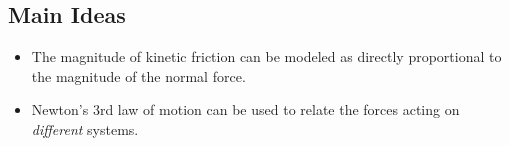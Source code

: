 \documentclass[]{article}
\begin{document}
\newpage
\begin{TeacherMargin}
	
\end{TeacherMargin}
\begin{PresentSpace}
\section*{Main Ideas}
\begin{itemize}
	\item The magnitude of kinetic friction can be modeled as directly proportional to the magnitude of the normal force.
	\item Newton's 3rd law of motion can be used to relate the forces acting on \textit{different} systems.
\end{itemize}
\end{PresentSpace}
\end{document}
